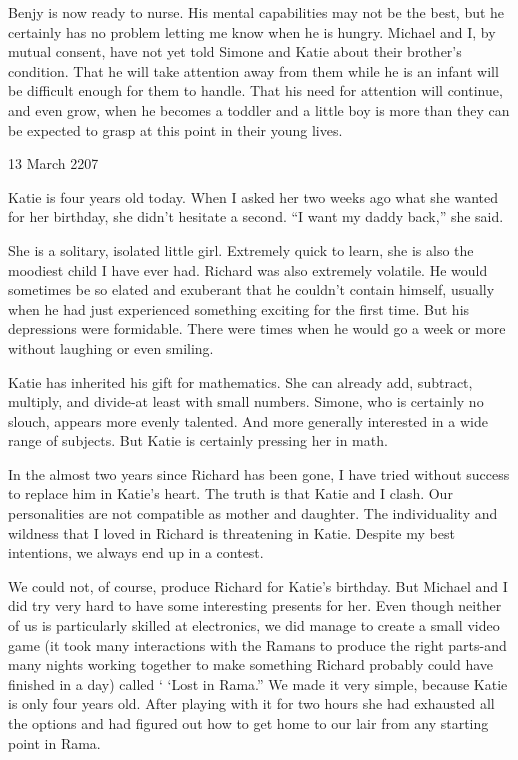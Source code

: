\documentclass[]{article}
\begin{document}
Benjy is now ready to nurse. His mental capabilities may not be the best, but he certainly has no problem letting me know when he is hungry. Michael and I, by mutual consent, have not yet told Simone and Katie about their brother’s condition. That he will take attention away from them while he is an infant will be difficult enough for them to handle. That his need for attention will continue, and even grow, when he becomes a toddler and a little boy is more than they can be expected to grasp at this point in their young lives.

13 March 2207

Katie is four years old today. When I asked her two weeks ago what she wanted for her birthday, she didn’t hesitate a second. “I want my daddy back,” she said.

She is a solitary, isolated little girl. Extremely quick to learn, she is also the moodiest child I have ever had. Richard was also extremely volatile. He would sometimes be so elated and exuberant that he couldn’t contain himself, usually when he had just experienced something exciting for the first time. But his depressions were formidable. There were times when he would go a week or more without laughing or even smiling.

Katie has inherited his gift for mathematics. She can already add, subtract, multiply, and divide-at least with small numbers. Simone, who is certainly no slouch, appears more evenly talented. And more generally interested in a wide range of subjects. But Katie is certainly pressing her in math.

In the almost two years since Richard has been gone, I have tried without success to replace him in Katie’s heart. The truth is that Katie and I clash. Our personalities are not compatible as mother and daughter. The individuality and wildness that I loved in Richard is threatening in Katie. Despite my best intentions, we always end up in a contest.

We could not, of course, produce Richard for Katie’s birthday. But Michael and I did try very hard to have some interesting presents for her. Even though neither of us is particularly skilled at electronics, we did manage to create a small video game (it took many interactions with the Ramans to produce the right parts-and many nights working together to make something Richard probably could have finished in a day) called ‘ ‘Lost in Rama.” We made it very simple, because Katie is only four years old. After playing with it for two hours she had exhausted all the options and had figured out how to get home to our lair from any starting point in Rama.
\end{document}
